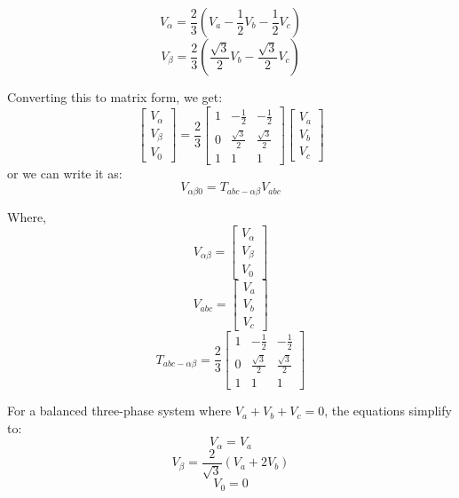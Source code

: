 \begin{equation}
    V_\alpha = \frac{2}{3}(V_a - \frac{1}{2} V_b - \frac{1}{2} V_c)
\end{equation}
\begin{equation}
    V_\beta = \frac{2}{3}(\frac{\sqrt{3}}{2} V_b - \frac{\sqrt{3}}{2} V_c)
\end{equation}

\noindent
Converting this to matrix form, we get:
\begin{equation}
    \begin{bmatrix}
        V_\alpha \\
        V_\beta  \\
        V_0
    \end{bmatrix}
    =\frac{2}{3}
    \begin{bmatrix}
        1 & -\frac{1}{2}       & -\frac{1}{2}       \\
        0 & \frac{\sqrt{3}}{2} & \frac{\sqrt{3}}{2} \\
        1 & 1                  & 1
    \end{bmatrix}
    \begin{bmatrix}
        V_a \\
        V_b \\
        V_c
    \end{bmatrix}
\end{equation}
or we can write it as:
\begin{equation}
    V_{\alpha\beta0} = T_{abc-\alpha\beta} V_{abc}
\end{equation}

\noindent
Where,
\begin{equation*}
    V_{\alpha\beta} = \begin{bmatrix}
        V_\alpha \\
        V_\beta  \\
        V_0
    \end{bmatrix}
\end{equation*}
\begin{equation*}
    V_{abc} = \begin{bmatrix}
        V_a \\
        V_b \\
        V_c
    \end{bmatrix}
\end{equation*}
\begin{equation*}
    T_{abc-\alpha\beta} = \frac{2}{3}
    \begin{bmatrix}
        1 & -\frac{1}{2}       & -\frac{1}{2}       \\
        0 & \frac{\sqrt{3}}{2} & \frac{\sqrt{3}}{2} \\
        1 & 1                  & 1
    \end{bmatrix}
\end{equation*}

\noindent
For a balanced three-phase system where \( V_a + V_b + V_c = 0 \), the equations simplify to:
\begin{equation*}
    V_\alpha = V_a
\end{equation*}
\begin{equation*}
    V_\beta = \frac{2}{\sqrt{3}} (V_a + 2 V_b)
\end{equation*}
\begin{equation*}
    V_0 = 0
\end{equation*}